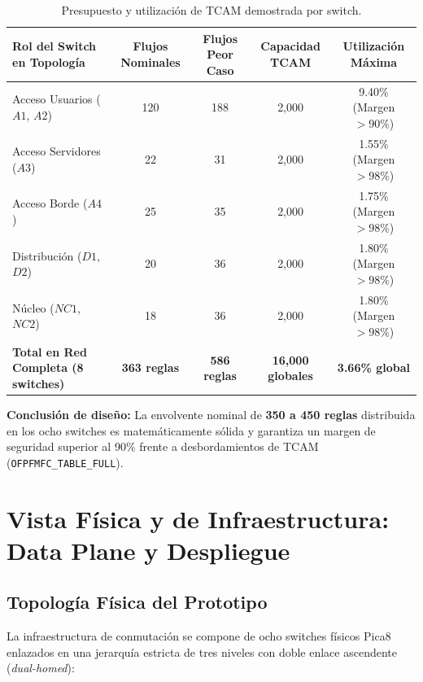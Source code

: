 \documentclass[11pt,a4paper]{report}
\begin{document}
\begin{table}[h!]
\centering
\small
\begin{tabularx}{\linewidth}{Xcccc}
\toprule
\textbf{Rol del Switch en Topología} & \textbf{Flujos Nominales} & \textbf{Flujos Peor Caso} & \textbf{Capacidad TCAM} & \textbf{Utilización Máxima} \\
\midrule
Acceso Usuarios ($A1$, $A2$) & 120 & 188 & 2,000 & 9.40\% (Margen $>90\%$) \\
Acceso Servidores ($A3$) & 22 & 31 & 2,000 & 1.55\% (Margen $>98\%$) \\
Acceso Borde ($A4$) & 25 & 35 & 2,000 & 1.75\% (Margen $>98\%$) \\
Distribución ($D1$, $D2$) & 20 & 36 & 2,000 & 1.80\% (Margen $>98\%$) \\
Núcleo ($NC1$, $NC2$) & 18 & 36 & 2,000 & 1.80\% (Margen $>98\%$) \\
\midrule
\textbf{Total en Red Completa (8 switches)} & \textbf{363 reglas} & \textbf{586 reglas} & \textbf{16,000 globales} & \textbf{3.66\% global} \\
\bottomrule
\end{tabularx}
\caption{Presupuesto y utilización de TCAM demostrada por switch.}
\label{tab:tcam}
\end{table}

\textbf{Conclusión de diseño:} La envolvente nominal de \textbf{350 a 450 reglas} distribuida en los ocho switches es matemáticamente sólida y garantiza un margen de seguridad superior al 90\% frente a desbordamientos de TCAM (\texttt{OFPFMFC\_TABLE\_FULL}).

\chapter{Vista Física y de Infraestructura: Data Plane y Despliegue}

\section{Topología Física del Prototipo}
La infraestructura de conmutación se compone de ocho switches físicos Pica8 enlazados en una jerarquía estricta de tres niveles con doble enlace ascendente (\emph{dual-homed}):
\end{document}
